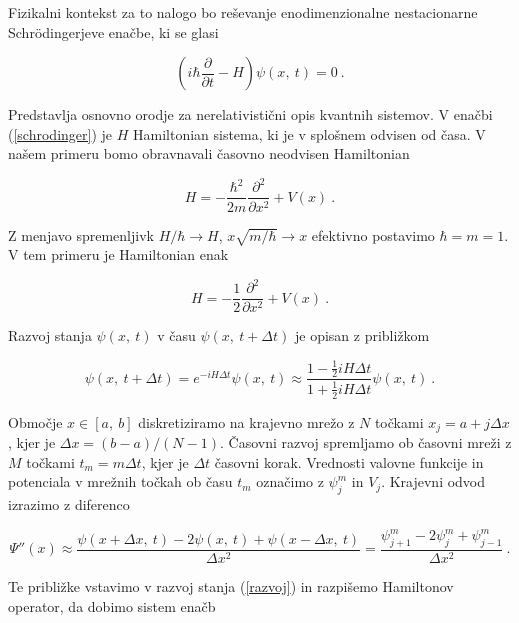 \documentclass[a4paper]{article}
\begin{document}
Fizikalni kontekst za to nalogo bo reševanje enodimenzionalne nestacionarne Schrödingerjeve enačbe, ki se
glasi

\begin{equation}
    \left( i\hbar \frac{\partial}{\partial t} - H\right) \psi(x,\>t) = 0\>.
    \label{schrodinger}
\end{equation}

Predstavlja osnovno orodje za nerelativistični opis kvantnih sistemov. V enačbi (\ref{schrodinger}) je $H$ Hamiltonian
sistema, ki je v splošnem odvisen od časa. V našem primeru bomo obravnavali časovno neodvisen Hamiltonian

\begin{equation}
    H = -\frac{\hbar^2}{2m} \frac{\partial^2}{\partial x^2} + V(x)\>.
    \label{hamiltonian}
\end{equation}

Z menjavo spremenljivk $H/\hbar \rightarrow H$, $x\sqrt{m/\hbar} \rightarrow x$ efektivno postavimo $\hbar = m = 1$.
V tem primeru je Hamiltonian enak

\begin{equation}
    H = -\frac{1}{2} \frac{\partial^2}{\partial x^2} + V(x)\>.
    \label{hamiltonian2}
\end{equation}

Razvoj stanja $\psi(x,\>t)$ v času $\psi(x,\>t + \Delta t)$ je opisan z približkom

\begin{equation}
    \psi(x,\>t + \Delta t) = e^{-iH\Delta t}\psi(x,\>t)\approx \dfrac{1-\frac{1}{2}iH\Delta t}
    {1+\frac{1}{2}iH\Delta t}\psi(x,\>t)\>.
    \label{razvoj}
\end{equation}

Območje $x\in[a,\>b]$ diskretiziramo na krajevno mrežo z $N$ točkami $x_j = a + j\Delta x$, kjer je $\Delta x = (b-a)/(N-1)$.
Časovni razvoj spremljamo ob časovni mreži z $M$ točkami $t_m = m\Delta t$, kjer je $\Delta t$ časovni korak. Vrednosti valovne
funkcije in potenciala v mrežnih točkah ob času $t_m$ označimo z $\psi_j^m$ in $V_j$. Krajevni odvod izrazimo z 
diferenco

\begin{equation}
    \Psi''(x) \approx \frac{\psi(x + \Delta x,\>t)-2\psi(x,\>t)+\psi(x-\Delta x,\>t)}{\Delta x^2} 
    = \frac{\psi_{j+1}^m - 2\psi_j^m + \psi_{j-1}^m}{\Delta x^2}\>.
    \label{krajevni_odvod}
\end{equation}

Te približke vstavimo v razvoj stanja (\ref{razvoj}) in razpišemo Hamiltonov operator, da dobimo sistem enačb
\end{document}
